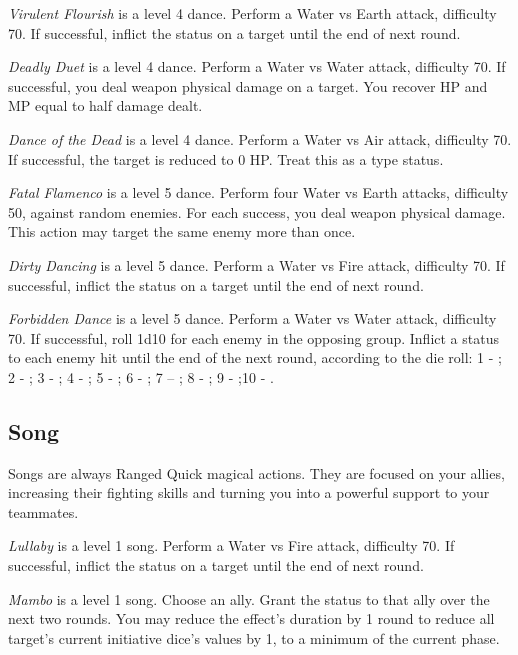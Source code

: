 \begin{multicols}{2}
    \textit{Virulent Flourish} is a level 4 dance. Perform a Water vs Earth attack, difficulty 70. If successful, inflict the  status on a target until the end of next round.
    
    \textit{Deadly Duet} is a level 4 dance. Perform a Water vs Water attack, difficulty 70. If successful, you deal weapon physical damage on a target. You recover HP and MP equal to half damage dealt.
    
    \textit{Dance of the Dead} is a level 4 dance. Perform a Water vs Air attack, difficulty 70. If successful, the target is reduced to 0 HP. Treat this as a  type status.
    
    \textit{Fatal Flamenco} is a level 5 dance. Perform four Water vs Earth attacks, difficulty 50, against random enemies. For each success, you deal weapon physical damage. This action may target the same enemy more than once.
    
    \textit{Dirty Dancing} is a level 5 dance. Perform a Water vs Fire attack, difficulty 70. If successful, inflict the  status on a target until the end of next round.
    
	\textit{Forbidden Dance} is a level 5 dance. Perform a Water vs Water attack, difficulty 70. If successful, roll 1d10 for each enemy in the opposing group. Inflict a status to each enemy hit until the end of the next round, according to the die roll: 1 - ; 2 - ; 3 - ; 4 - ; 5 - ; 6 - ; 7 – ; 8 - ; 9 -  ;10 - .

    \subsection{Song}
    \label{subsec:perf-song}

    Songs are always Ranged Quick magical actions. They are focused on your allies, increasing their fighting skills and turning you into a powerful support to your teammates.
    
    \textit{Lullaby} is a level 1 song. Perform a Water vs Fire attack, difficulty 70. If successful, inflict the  status on a target until the end of next round.
    
    \textit{Mambo} is a level 1 song. Choose an ally. Grant the  status to that ally over the next two rounds. You may reduce the effect's duration by 1 round to reduce all target's current initiative dice's values by 1, to a minimum of the current phase.
    

\end{multicols}
